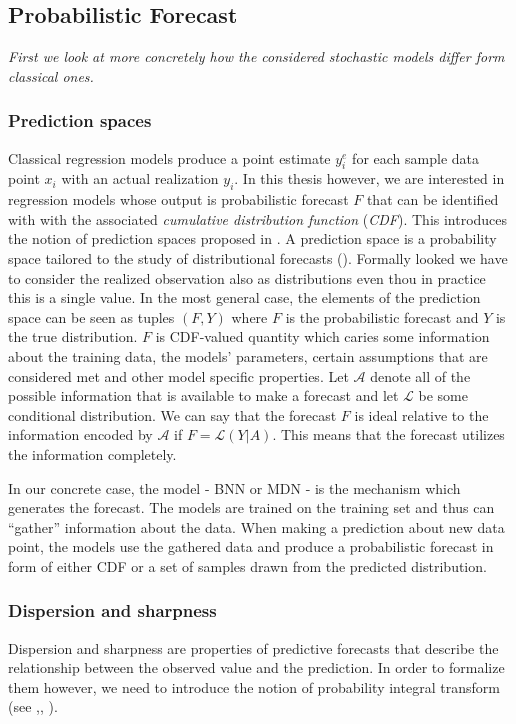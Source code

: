 \documentclass[12pt,a4paper,twoside]{scrartcl}
\numberwithin{equation}{section}
\begin{document}
\subsection{Probabilistic Forecast}
\label{sec:prob-forecast}

\emph{First we look at more concretely how the considered stochastic models differ form classical ones.}
\subsubsection{Prediction spaces}
\label{sec:pred-space}

Classical regression models produce a point estimate \(y_i^e\) for each sample data point \(x_i\) with an actual realization \(y_i\). In this thesis however, we are interested in regression models whose output is probabilistic forecast \(F\) that can be identified with with the associated \emph{cumulative distribution function} (\emph{CDF}). This introduces the notion of prediction spaces proposed in \cite{gneiting2013}. A prediction space is a probability space tailored to the study of distributional forecasts (\cite{gneiting2014}). Formally looked we have to consider the realized observation also as distributions even thou in practice this is a single value. In the most general case, the elements of the prediction space can be seen as tuples \((F, Y)\) where \(F\) is the probabilistic forecast and \(Y\) is the true distribution. \(F\) is CDF-valued quantity which caries some information about the training data, the models' parameters, certain assumptions that are considered met and other model specific properties. Let \(\mathcal{A}\) denote all of the possible information that is available to make a forecast and let \(\mathcal{L}\) be some conditional distribution. We can say that the forecast \(F\) is ideal relative to the information encoded by \(\mathcal{A}\) if \(F=\mathcal{L}(Y | A)\). This means that the forecast utilizes the information completely. 

In our concrete case, the model - BNN or MDN - is the mechanism which generates the forecast. The models are trained on the training set and thus can ``gather'' information about the data. When making a prediction about new data point, the models use the gathered data and produce a probabilistic forecast in form of either CDF or a set of samples drawn from the predicted distribution.

\subsubsection{Dispersion and sharpness}\label{sec:disp-sharp}
Dispersion and  sharpness are properties of predictive forecasts that describe the relationship between the observed value and the prediction. In order to formalize them however, we need to introduce the notion of probability integral transform (see \cite{diebold1998},\cite{gneiting2007}, \cite{dawid84}).
\end{document}
